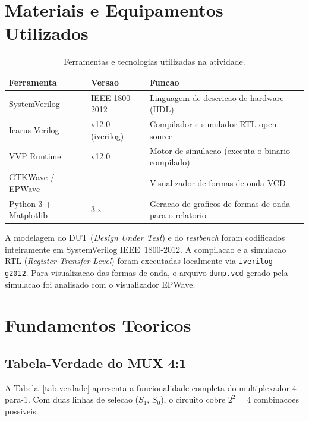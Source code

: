 \documentclass[12pt, a4paper]{article}
\begin{document}
\section{Materiais e Equipamentos Utilizados}

\begin{table}[H]
\centering
\small
\caption{Ferramentas e tecnologias utilizadas na atividade.}
\label{tab:ferramentas}
\begin{tabular}{p{3.5cm}p{3.0cm}p{6.5cm}}
\toprule
\textbf{Ferramenta} & \textbf{Versao} & \textbf{Funcao}\\
\midrule
SystemVerilog & IEEE 1800-2012 & Linguagem de descricao de hardware (HDL) \\
Icarus Verilog & v12.0 (iverilog) & Compilador e simulador RTL open-source \\
VVP Runtime & v12.0 & Motor de simulacao (executa o binario compilado) \\
GTKWave / EPWave & -- & Visualizador de formas de onda VCD \\
Python 3 + Matplotlib & 3.x & Geracao de graficos de formas de onda para o relatorio \\
\bottomrule
\end{tabular}
\end{table}

A modelagem do DUT (\textit{Design Under Test}) e do \textit{testbench} foram
codificados inteiramente em SystemVerilog IEEE~1800-2012. A compilacao e a
simulacao RTL (\textit{Register-Transfer Level}) foram executadas localmente
via \texttt{iverilog -g2012}. Para visualizacao das formas de onda, o arquivo
\texttt{dump.vcd} gerado pela simulacao foi analisado com o visualizador EPWave.

\section{Fundamentos Teoricos}

\subsection{Tabela-Verdade do MUX 4:1}

A Tabela~\ref{tab:verdade} apresenta a funcionalidade completa do multiplexador 4-para-1.
Com duas linhas de selecao ($S_1$, $S_0$), o circuito cobre $2^2 = 4$ combinacoes possiveis.
\end{document}
